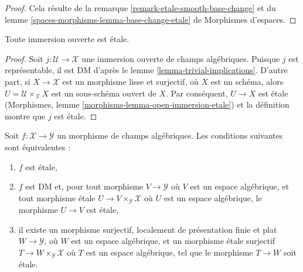 \begin{proof}
Cela résulte de la remarque \ref{remark-etale-smooth-base-change}
et du lemme \ref{spaces-morphisms-lemma-base-change-etale} de
Morphismes d'espaces.
\end{proof}

\begin{lemma}
\label{lemma-open-immersion-etale}
Toute immersion ouverte est \'etale.
\end{lemma}

\begin{proof}
Soit $j : \mathcal{U} \to \mathcal{X}$ une immersion ouverte de
champs alg\'ebriques. Puisque $j$ est repr\'esentable, il est DM d'apr\`es
le lemme \ref{lemma-trivial-implications}. D'autre part,
si $X \to \mathcal{X}$ est un morphisme lisse et surjectif,
o\`u $X$ est un sch\'ema, alors $U = \mathcal{U} \times_\mathcal{X} X$
est un sous-sch\'ema ouvert de $X$. Par cons\'equent, $U \to X$ est \'etale
(Morphismes, lemme \ref{morphisms-lemma-open-immersion-etale})
et la d\'efinition montre que $j$ est \'etale.
\end{proof}

\begin{lemma}
\label{lemma-etale}
Soit $f : \mathcal{X} \to \mathcal{Y}$ un morphisme de champs alg\'ebriques.
Les conditions suivantes sont \'equivalentes :
\begin{enumerate}
\item $f$ est \'etale,
\item $f$ est DM et, pour tout morphisme $V \to \mathcal{Y}$
o\`u $V$ est un espace alg\'ebrique, et tout morphisme \'etale
$U \to V \times_\mathcal{Y} \mathcal{X}$ o\`u $U$ est un espace alg\'ebrique,
le morphisme $U \to V$ est \'etale,
\item il existe un morphisme surjectif, localement de pr\'esentation finie et plat
$W \to \mathcal{Y}$, o\`u $W$ est un espace alg\'ebrique, et un
morphisme \'etale surjectif $T \to W \times_\mathcal{Y} \mathcal{X}$
o\`u $T$ est un espace alg\'ebrique, tel que le morphisme $T \to W$ soit \'etale.
\end{enumerate}
\end{lemma}

